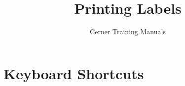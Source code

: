 

\title{Printing Labels} %
\author{Cerner Training Manuals}




    \frontmatter

        \chapter{Keyboard Shortcuts}
        \begin{fullwidth}
        \begin{center}
            
        \end{center}
        \end{fullwidth}



